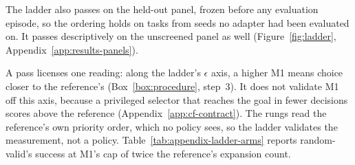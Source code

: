 The ladder also passes on the held-out panel, frozen before any evaluation episode, so the ordering holds on tasks from seeds no adapter had been evaluated on. It passes descriptively on the unscreened panel as well (Figure~\ref{fig:ladder}, Appendix~\ref{app:results-panels}).

A pass licenses one reading: along the ladder's $\epsilon$ axis, a higher M1 means choice closer to the reference's (Box~\ref{box:procedure}, step~3). It does not validate M1 off this axis, because a privileged selector that reaches the goal in fewer decisions scores above the reference (Appendix~\ref{app:cf-contract}). The rungs read the reference's own priority order, which no policy sees, so the ladder validates the measurement, not a policy. Table~\ref{tab:appendix-ladder-arms} reports random-valid's success at M1's cap of twice the reference's expansion count.

